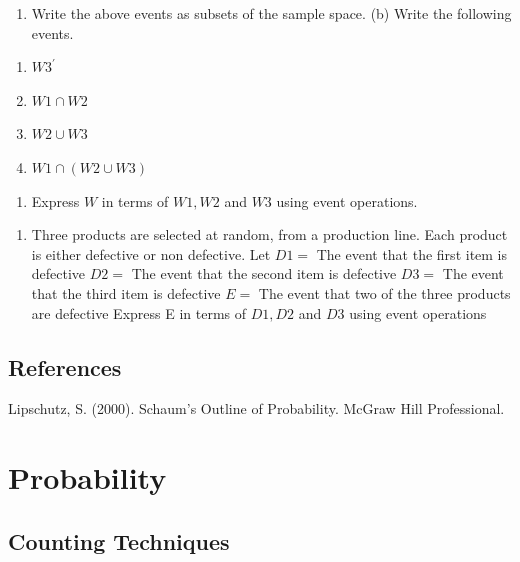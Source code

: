 \documentclass[]{book}
\providecommand{\tightlist}{%
  \setlength{\itemsep}{0pt}\setlength{\parskip}{0pt}}
\begin{document}
\begin{enumerate}
\def\labelenumi{(\alph{enumi})}
\tightlist
\item
  Write the above events as subsets of the sample space. (b) Write the following events.
\end{enumerate}

\begin{enumerate}
\def\labelenumi{\roman{enumi}.}
\tightlist
\item
  \(W3^\prime\)
\item
  \(W1 \cap W2\)
\item
  \(W2 \cup W3\)
\item
  \(W1 \cap (W2 \cup W3)\)
\end{enumerate}

\begin{enumerate}
\def\labelenumi{(\alph{enumi})}
\setcounter{enumi}{2}
\tightlist
\item
  Express \(W\) in terms of \(W1, W2\) and \(W3\) using event operations.
\end{enumerate}

\begin{enumerate}
\def\labelenumi{\arabic{enumi}.}
\setcounter{enumi}{11}
\tightlist
\item
  Three products are selected at random, from a production line. Each product is either defective or non defective. Let
  \(D1 =\) The event that the first item is defective
  \(D2 =\) The event that the second item is defective
  \(D3 =\) The event that the third item is defective
  \(E =\) The event that two of the three products are defective Express E in terms of \(D1, D2\) and \(D3\) using event operations
\end{enumerate}

\hypertarget{references-5}{%
\section*{References}\label{references-5}}

Lipschutz, S. (2000). Schaum's Outline of Probability. McGraw Hill Professional.

\hypertarget{probability}{%
\chapter{Probability}\label{probability}}


\hypertarget{counting-techniques}{%
\section{Counting Techniques}\label{counting-techniques}}
\end{document}

